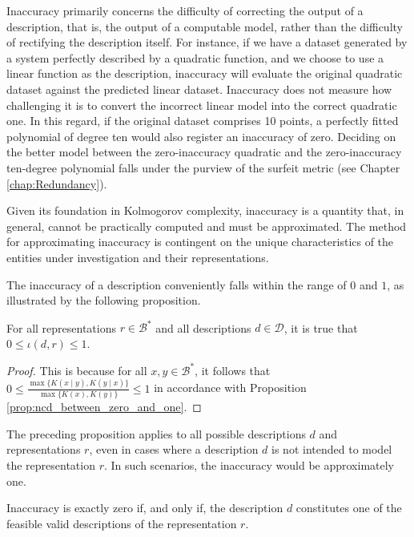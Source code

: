 \begin{example}
Inaccuracy primarily concerns the difficulty of correcting the output of a description, that is, the output of a computable model, rather than the difficulty of rectifying the description itself. For instance, if we have a dataset generated by a system perfectly described by a quadratic function, and we choose to use a linear function as the description, inaccuracy will evaluate the original quadratic dataset against the predicted linear dataset. Inaccuracy does not measure how challenging it is to convert the incorrect linear model into the correct quadratic one. In this regard, if the original dataset comprises 10 points, a perfectly fitted polynomial of degree ten would also register an inaccuracy of zero. Deciding on the better model between the zero-inaccuracy quadratic and the zero-inaccuracy ten-degree polynomial falls under the purview of the surfeit metric (see Chapter \ref{chap:Redundancy}).
\end{example}

Given its foundation in Kolmogorov complexity, inaccuracy is a quantity that, in general, cannot be practically computed and must be approximated. The method for approximating inaccuracy is contingent on the unique characteristics of the entities under investigation and their representations.

The inaccuracy of a description conveniently falls within the range of $0$ and $1$, as illustrated by the following proposition.

\begin{proposition}
\label{prop:inaccuracy:inaccuracy:range}
For all representations $r \in \mathcal{B}^\ast$ and all descriptions $d \in \mathcal{D}$, it is true that $0 \leq \iota(d, r) \leq 1$.
\end{proposition}
\begin{proof}
This is because for all $x, y \in \mathcal{B}^\ast$, it follows that $0 \leq \frac{ \max\{ K(x \mid y), K(y \mid x) \} } { \max\{ K(x), K(y) \} } \leq 1$ in accordance with Proposition \ref{prop:ncd_between_zero_and_one}.
\end{proof}

The preceding proposition applies to all possible descriptions $d$ and representations $r$, even in cases where a description $d$ is not intended to model the representation $r$. In such scenarios, the inaccuracy would be approximately one.

Inaccuracy is exactly zero if, and only if, the description $d$ constitutes one of the feasible valid descriptions of the representation $r$.

